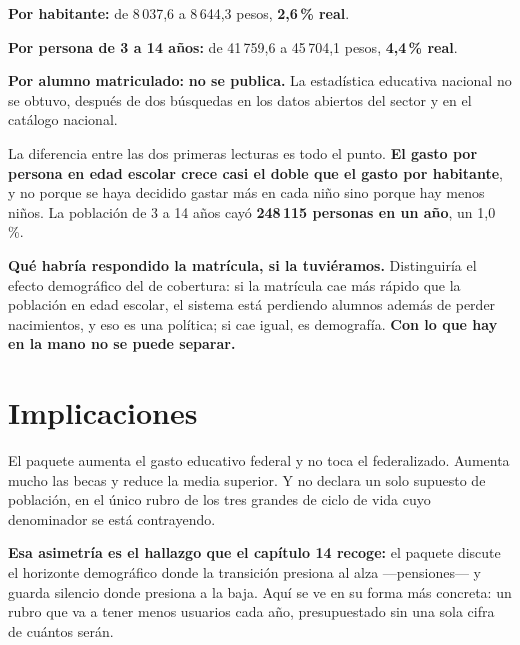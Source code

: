 \begin{list}{}{\setlength{\leftmargin}{1.4em}\setlength{\itemsep}{2pt}}
\item[$\bullet$] \textbf{Por habitante:} de 8\,037,6 a 8\,644,3 pesos, \textbf{2,6\,\% real}.
\item[$\bullet$] \textbf{Por persona de 3 a 14 años:} de 41\,759,6 a 45\,704,1 pesos,
\textbf{4,4\,\% real}.
\item[$\bullet$] \textbf{Por alumno matriculado:} \textbf{no se publica.} La estadística
educativa nacional no se obtuvo, después de dos búsquedas en los datos abiertos del sector y
en el catálogo nacional.
\end{list}

La diferencia entre las dos primeras lecturas es todo el punto. \textbf{El gasto por persona
en edad escolar crece casi el doble que el gasto por habitante}, y no porque se haya decidido
gastar más en cada niño sino porque hay menos niños. La población de 3 a 14 años cayó
\textbf{248\,115 personas en un año}, un 1,0\,\%.

\textbf{Qué habría respondido la matrícula, si la tuviéramos.} Distinguiría el efecto
demográfico del de cobertura: si la matrícula cae más rápido que la población en edad escolar,
el sistema está perdiendo alumnos además de perder nacimientos, y eso es una política; si cae
igual, es demografía. \textbf{Con lo que hay en la mano no se puede separar.}

\section{Implicaciones}

El paquete aumenta el gasto educativo federal y no toca el federalizado. Aumenta mucho las
becas y reduce la media superior. Y no declara un solo supuesto de población, en el único
rubro de los tres grandes de ciclo de vida cuyo denominador se está contrayendo.

\textbf{Esa asimetría es el hallazgo que el capítulo 14 recoge:} el paquete discute el
horizonte demográfico donde la transición presiona al alza ---pensiones--- y guarda silencio
donde presiona a la baja. Aquí se ve en su forma más concreta: un rubro que va a tener menos
usuarios cada año, presupuestado sin una sola cifra de cuántos serán.


